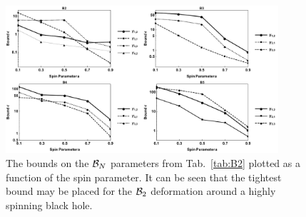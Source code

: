 \begin{figure}[t]
 \centering
 \includegraphics[trim=0cm 0cm 0cm 0cm, width=0.9\textwidth]{fig_summary.pdf}
 \caption{The bounds on the ${\cal{B}}_{N}$ parameters from Tab.\ \ref{tab:B2} plotted as a function of the spin parameter. It can be seen that the tightest bound may be placed for the ${\cal{B}}_{2}$ deformation around a highly spinning black hole.}
 \label{fig:summary}
\end{figure}



